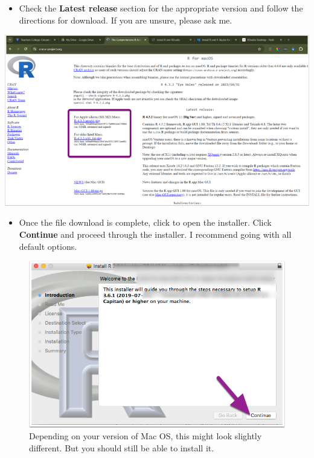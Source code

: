 \documentclass[
]{book}
\providecommand{\tightlist}{%
  \setlength{\itemsep}{0pt}\setlength{\parskip}{0pt}}
\begin{document}
\begin{itemize}
\tightlist
\item
  Check the \textbf{Latest release} section for the appropriate version and follow the directions for download. If you are unsure, please ask me.
\end{itemize}

\includegraphics{img/01-rversion-mac.png}

\begin{itemize}
\tightlist
\item
  Once the file download is complete, click to open the installer. Click \textbf{Continue} and proceed through the installer. I recommend going with all default options.
\end{itemize}

\begin{figure}
\centering
\includegraphics{img/01-mac_installer.png}
\caption{\label{fig:unnamed-chunk-9}Depending on your version of Mac OS, this might look slightly different. But you should still be able to install it.}
\end{figure}
\end{document}
